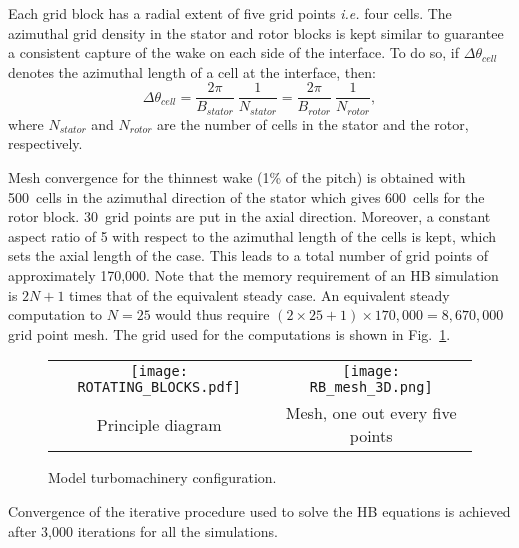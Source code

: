 Each grid block has a radial extent of five grid points \emph{i.e.} four cells. 
The azimuthal grid density in the stator and rotor blocks is kept similar
to guarantee a consistent capture of the wake on each side of the interface.
To do so, if $\Delta \theta_{cell}$ denotes the azimuthal length of a cell
at the interface, then:
\begin{equation}
   \Delta \theta_{cell} = \frac{2\pi}{B_{stator}}~\frac{1}{N_{stator}}
   = \frac{2\pi}{B_{rotor}}~\frac{1}{N_{rotor}},
   \label{eq:az_spatial_discretization_1}
\end{equation}
where $N_{stator}$ and $N_{rotor}$ are the number of cells
in the stator and the rotor, respectively. 

Mesh convergence for the thinnest wake (1\% of the pitch)
is obtained with 500~cells in the azimuthal direction of
the stator which gives
600~cells for the rotor block.
30~grid points are put in the axial direction. Moreover, a constant
aspect ratio of 5 with respect to the azimuthal length of the cells is
kept, which sets the axial length of the case.
This leads to a total number of grid points of approximately 
170,000. 
Note that the memory requirement of an HB 
simulation is $2N+1$ times that of the equivalent steady case. 
An equivalent steady computation to $N=25$ would 
thus require 
$(2 \times 25 + 1) \times 170,000 = 8,670,000$ grid point mesh.
The grid used for the computations is shown in Fig.~\ref{fig:rotating_blocks}.
\begin{figure}[htb]
  \centering
  \begin{tabular}{cc}
    \texttt{[image: ROTATING\_BLOCKS.pdf]}
    &
    \texttt{[image: RB\_mesh\_3D.png]}\\
    Principle diagram 
    &
    Mesh, one out every five points
  \end{tabular}
\caption{Model turbomachinery configuration.}
\label{fig:rotating_blocks}
\end{figure}
Convergence of the iterative procedure used to solve the HB equations is achieved 
after 3,000 iterations for 
all the simulations. 